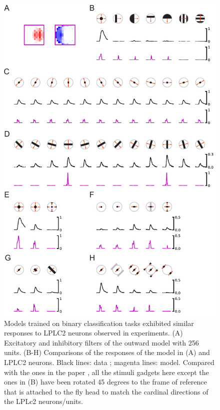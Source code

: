 \documentclass[pdftex,9pt,lineno]{elife}
\begin{document}
\begin{figure}
\includegraphics[width=0.8\linewidth]{figures/replication_paper.pdf}
\caption{Models trained on binary classification tasks exhibited similar responses to LPLC2 neurons observed in experiments. (A) Excitatory and inhibitory filters of the outward model with 256 units. (B-H) Comparisons of the responses of the model in (A) and LPLC2 neurons. Black lines: data \citep{klapoetke2017ultra}; magenta lines: model. Compared with the ones in the paper \citep{klapoetke2017ultra}, all the stimuli gadgets here except the ones in (B) have been rotated 45 degrees to the frame of reference that is attached to the fly head to match the cardinal directions of the LPLc2 neurons/units.}
\label{fig:replication}

\end{figure}
\end{document}
